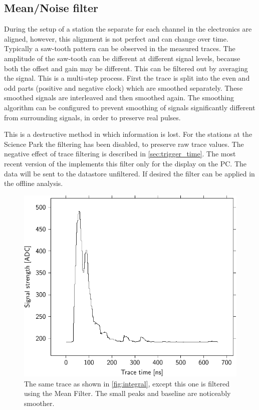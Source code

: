 \subsection{Mean/Noise filter}

During the setup of a station the separate \adcs for each channel in the \hisparc electronics are aligned, however, this alignment is not perfect and can change over time. Typically a saw-tooth pattern can be observed in the measured traces. The amplitude of the saw-tooth can be different at different signal levels, because both the offset and gain may be different. This can be filtered out by averaging the signal. This is a multi-step process. First the trace is split into the even and odd parts (positive and negative clock) which are smoothed separately. These smoothed signals are interleaved and then smoothed again. The smoothing algorithm can be configured to prevent smoothing of signals significantly different from surrounding signals, in order to preserve real pulses.

This is a destructive method in which information is lost. For the \hisparc stations at the Science Park the filtering has been disabled, to preserve raw trace values. The negative effect of trace filtering is described in \cref{sec:trigger_time}. The most recent version of the \hisparc \daq implements this filter only for the display on the \hisparc PC. The data will be sent to the datastore unfiltered. If desired the filter can be applied in the offline analysis.

\begin{figure}
    \centering
    \includegraphics[width=0.7\linewidth]{plots/processing/mean_filter}
    \caption{The same trace as shown in \cref{fig:integral}, except this one is filtered using the Mean Filter. The small peaks and baseline are noticeably smoother.}
    \label{fig:mean_filter}
\end{figure}


